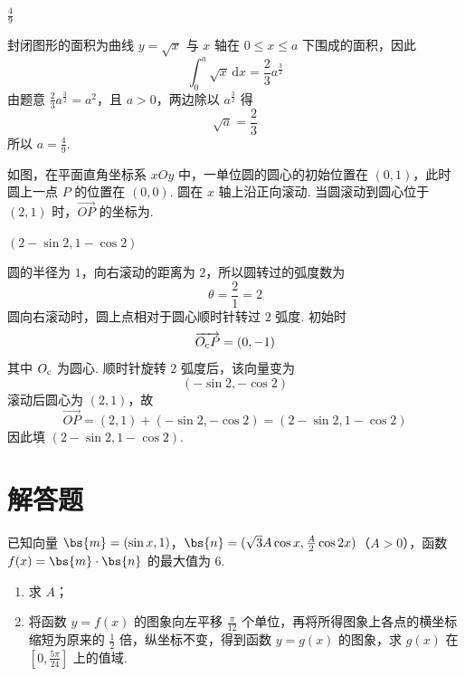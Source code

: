 \begin{answer}
\(\frac{4}{9}\)
\end{answer}

\begin{solution}
封闭图形的面积为曲线 \(y=\sqrt{x}\) 与 \(x\) 轴在 \(0\leqslant x\leqslant a\) 下围成的面积，因此
\[
\int_0^a\sqrt{x}\,\mathrm{d}x=\frac23a^{\frac{3}{2}}
\]
由题意 \(\frac23a^{\frac{3}{2}}=a^2\)，且 \(a>0\)，两边除以 \(a^{\frac{3}{2}}\) 得
\[
\sqrt a=\frac23
\]
所以 \(a=\frac49\).
\end{solution}

\begin{problem}
如图，在平面直角坐标系 \(xOy\) 中，一单位圆的圆心的初始位置在 \((0, 1)\)，此时圆上一点 \(P\) 的位置在 \((0, 0)\). 圆在 \(x\) 轴上沿正向滚动. 当圆滚动到圆心位于 \((2, 1)\) 时，\(\overrightarrow{OP}\) 的坐标为\fillinblank{}.

\end{problem}

\begin{answer}
\(\left(2 - \sin 2, 1 - \cos 2\right)\)
\end{answer}

\begin{solution}
圆的半径为 \(1\)，向右滚动的距离为 \(2\)，所以圆转过的弧度数为
\[
\theta=\frac{2}{1}=2
\]
圆向右滚动时，圆上点相对于圆心顺时针转过 \(2\) 弧度. 初始时
\[
\overrightarrow{O_{\rm c}P}=(0,-1)
\]
其中 \(O_{\rm c}\) 为圆心. 顺时针旋转 \(2\) 弧度后，该向量变为
\[
(-\sin2,-\cos2)
\]
滚动后圆心为 \((2,1)\)，故
\[
\overrightarrow{OP}=(2,1)+(-\sin2,-\cos2)
=\left(2-\sin2,1-\cos2\right)
\]
因此填 \(\left(2-\sin2,1-\cos2\right)\).
\end{solution}

\section{解答题}

\begin{problem}
已知向量 \(\bs{m} = (\sin x, 1)\)，\(\bs{n} = (\sqrt{3}A \cos x, \frac{A}{2} \cos 2x)\)（\(A > 0\)），函数 \(f(x) = \bs{m} \cdot \bs{n}\) 的最大值为 6.
\begin{enumerate}
\item 求 \(A\)；
\item 将函数 \(y = f(x)\) 的图象向左平移 \(\frac{\pi}{12}\) 个单位，再将所得图象上各点的横坐标缩短为原来的 \(\frac{1}{2}\) 倍，纵坐标不变，得到函数 \(y = g(x)\) 的图象，求 \(g(x)\) 在 \(\left[0, \frac{5\pi}{24}\right]\) 上的值域.
\end{enumerate}
\end{problem}

